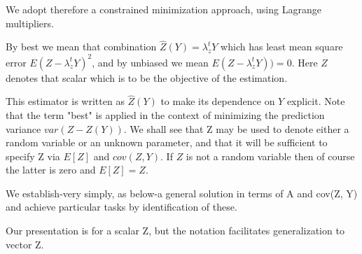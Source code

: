 \documentclass[Main.tex]{subfiles}
\begin{document}
		We adopt therefore a constrained minimization approach, using Lagrange multipliers. 
		
		
		By best we mean that combination $\hat{Z}(Y) = \lambda_{z}^{t}Y$ which has least mean square error $E( Z- \lambda_{z}^{t}Y)^2$, and by unbiased we mean $E( Z- \lambda_{z}^{t}Y)) = 0$. 
	Here $Z$ denotes that scalar which is to be the objective of the estimation. 
	
\bigskip	
	This estimator is written as $\hat{Z}(Y)$ to make its dependence on $Y$ explicit. Note that the term "best" is applied in the context of minimizing the prediction variance $var(Z - Z(Y))$. We shall see that Z may be used to denote either a random variable or an unknown parameter, and that it will be sufficient to specify Z via $E[Z]$ and $cov(Z, Y)$. If $Z$ is not a random variable then of course the latter is zero and $E[Z] = Z$. 
	
	We establish-very simply, as below-a general solution in terms of A and cov(Z, Y) and achieve particular tasks by identification of these. 
	
	Our presentation is for a scalar Z, but the notation facilitates generalization to vector Z. 
\bigskip	
	
\end{document}

